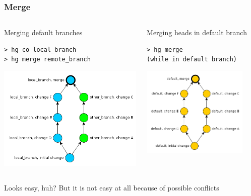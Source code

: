 \documentclass{beamer}
\begin{document}
\begin{frame}[fragile]
\frametitle{Merge}
\begin{columns}[T]
\begin{column}{0.45\textwidth}
\begin{exampleblock}{Merging default branches}
\begin{verbatim}
> hg co local_branch
> hg merge remote_branch
\end{verbatim}
\end{exampleblock}
\includegraphics[width=\textwidth]{img/two_branches_merged}
\end{column}

\begin{column}{0.45\textwidth}
\begin{exampleblock}{Merging heads in default branch}
\begin{verbatim}
> hg merge 
(while in default branch)
\end{verbatim}
\end{exampleblock}
\includegraphics[width=0.86\textwidth]{img/two_default_branches_merged}
\end{column}
\end{columns}
\begin{center}
Looks easy, huh? But it is not easy at all because of possible conflicts
\end{center}
\end{frame}
\end{document}
